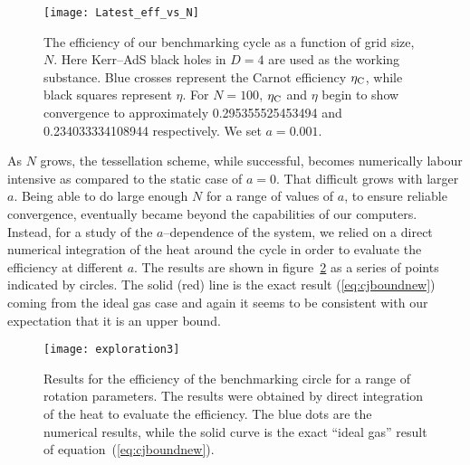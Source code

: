 \documentclass[letterpaper,11pt]{article}
\begin{document}
\begin{figure}[h]
\begin{center}
{\centering
\texttt{[image: Latest\_eff\_vs\_N]} 
   \caption{\footnotesize  The efficiency of our benchmarking cycle as a function of grid size, $N$. Here Kerr--AdS black holes in $D=4$ are used as the working substance. Blue crosses represent the  Carnot efficiency $\eta_{\rm C}$, while black squares represent $\eta$. For $N=100$, $\eta_{\rm C}$ and $\eta$ begin to show convergence to approximately 0.295355525453494 and 0.234033334108944 respectively. We set $a=0.001$.}   \label{fig:loop}
}
   \end{center}
\end{figure}

As $N$ grows, the tessellation scheme, while successful, becomes numerically labour intensive as compared to the static case of $a=0$. That difficult grows with larger $a$. Being able to do large enough $N$ for a range of values of $a$, to ensure reliable convergence,  eventually became beyond the capabilities of our computers. Instead, for a study of the $a$--dependence of the system, we relied on a direct numerical integration of the heat around the cycle in order to evaluate the efficiency at different  $a$. The results are shown in figure~\ref{fig:comparetoexact} as a series of points indicated by circles. The solid (red) line is the exact result (\ref{eq:cjboundnew}) coming from the ideal gas case and again it seems to be consistent with our expectation that it is an upper bound.

\begin{figure}[h]
\begin{center}
{\centering
\texttt{[image: exploration3]} 
   \caption{\footnotesize  Results for the efficiency of the benchmarking circle for a range of rotation parameters. The results were obtained by direct integration of the heat to evaluate the efficiency. The blue dots are the numerical results, while the solid curve is the exact ``ideal gas'' result of equation~(\ref{eq:cjboundnew}).}   \label{fig:comparetoexact}
}
   \end{center}
\end{figure}
\end{document}
